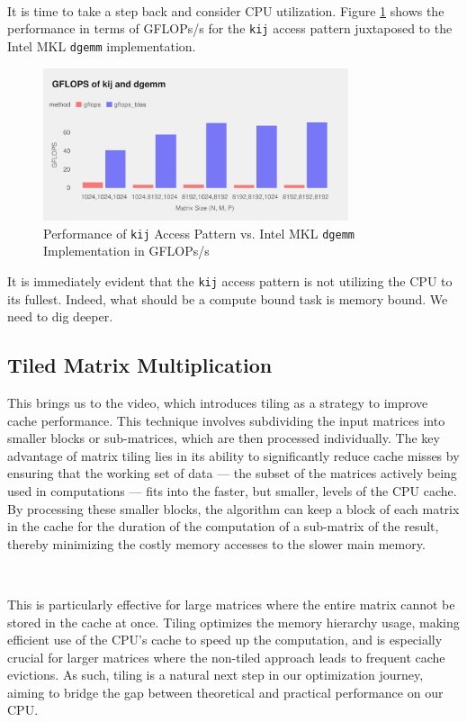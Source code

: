 \documentclass{article}
\begin{document}
\ 

\noindent It is time to take a step back and consider CPU utilization. Figure \ref{FIG:CPU-UTILIZATION} shows the performance 
in terms of GFLOPs/s for the \texttt{kij} access pattern juxtaposed to the Intel MKL \texttt{dgemm} implementation. 
\begin{figure}[H]
    \centering
    \includegraphics[width=0.8\textwidth]{../../project/out/kij-gflops.pdf}
    \caption{Performance of \texttt{kij} Access Pattern vs. Intel MKL \texttt{dgemm} Implementation in GFLOPs/s}
    \label{FIG:CPU-UTILIZATION}
\end{figure}
\noindent It is immediately evident that the \texttt{kij} access pattern is not utilizing the CPU to its fullest. 
Indeed, what should be a compute bound task is memory bound. We need to dig deeper.

\subsection{Tiled Matrix Multiplication}
This brings us to the video, which introduces tiling as a strategy to improve cache performance. 
This technique involves subdividing the input matrices into smaller blocks or sub-matrices, 
which are then processed individually. The key advantage of matrix tiling lies in its 
ability to significantly reduce cache misses by ensuring that the working set of data — 
the subset of the matrices actively being used in computations — fits into the faster, 
but smaller, levels of the CPU cache. By processing these smaller blocks, 
the algorithm can keep a block of each matrix in the cache for the duration of 
the computation of a sub-matrix of the result, thereby minimizing the costly memory 
accesses to the slower main memory. 

\ 

\noindent This is particularly effective for large matrices where the entire matrix 
cannot be stored in the cache at once. Tiling optimizes the memory hierarchy usage, 
making efficient use of the CPU's cache to speed up the computation, and is especially 
crucial for larger matrices where the non-tiled approach leads to frequent cache evictions. 
As such, tiling is a natural next step in our optimization journey, 
aiming to bridge the gap between theoretical and practical performance on our CPU.
\end{document}
